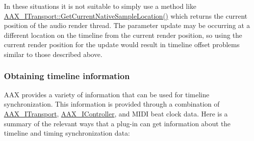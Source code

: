 In these situations it is not suitable to simply use a method like \mbox{\hyperlink{a01885_a8119233b03774528ffaa519771d792a0}{A\+A\+X\+\_\+\+I\+Transport\+::\+Get\+Current\+Native\+Sample\+Location()}} which returns the current position of the audio render thread. The parameter update may be occurring at a different location on the timeline from the current render position, so using the current render position for the update would result in timeline offset problems similar to those described above.\hypertarget{a00821_parameterUpdateTiming_timelineMethods}{}\subsubsection{Obtaining timeline information}\label{a00821_parameterUpdateTiming_timelineMethods}
A\+AX provides a variety of information that can be used for timeline synchronization. This information is provided through a combination of \mbox{\hyperlink{a01885}{A\+A\+X\+\_\+\+I\+Transport}}, \mbox{\hyperlink{a01789}{A\+A\+X\+\_\+\+I\+Controller}}, and M\+I\+DI beat clock data. Here is a summary of the relevant ways that a plug-\/in can get information about the timeline and timing synchronization data\+:


